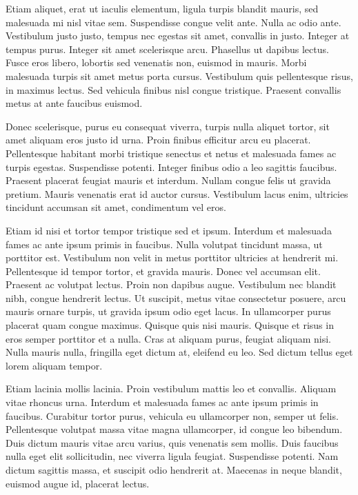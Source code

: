 Etiam aliquet, erat ut iaculis elementum, ligula turpis blandit mauris,
sed malesuada mi nisl vitae sem. Suspendisse congue velit ante. Nulla
ac odio ante. Vestibulum justo justo, tempus nec egestas sit amet,
convallis in justo. Integer at tempus purus. Integer sit amet scelerisque
arcu. Phasellus ut dapibus lectus. Fusce eros libero, lobortis sed
venenatis non, euismod in mauris. Morbi malesuada turpis sit amet
metus porta cursus. Vestibulum quis pellentesque risus, in maximus
lectus. Sed vehicula finibus nisl congue tristique. Praesent convallis
metus at ante faucibus euismod.

Donec scelerisque, purus eu consequat viverra, turpis nulla aliquet
tortor, sit amet aliquam eros justo id urna. Proin finibus efficitur
arcu eu placerat. Pellentesque habitant morbi tristique senectus et
netus et malesuada fames ac turpis egestas. Suspendisse potenti. Integer
finibus odio a leo sagittis faucibus. Praesent placerat feugiat mauris
et interdum. Nullam congue felis ut gravida pretium. Mauris venenatis
erat id auctor cursus. Vestibulum lacus enim, ultricies tincidunt
accumsan sit amet, condimentum vel eros.

Etiam id nisi et tortor tempor tristique sed et ipsum. Interdum et
malesuada fames ac ante ipsum primis in faucibus. Nulla volutpat tincidunt
massa, ut porttitor est. Vestibulum non velit in metus porttitor ultricies
at hendrerit mi. Pellentesque id tempor tortor, et gravida mauris.
Donec vel accumsan elit. Praesent ac volutpat lectus. Proin non dapibus
augue. Vestibulum nec blandit nibh, congue hendrerit lectus. Ut suscipit,
metus vitae consectetur posuere, arcu mauris ornare turpis, ut gravida
ipsum odio eget lacus. In ullamcorper purus placerat quam congue maximus.
Quisque quis nisi mauris. Quisque et risus in eros semper porttitor
et a nulla. Cras at aliquam purus, feugiat aliquam nisi. Nulla mauris
nulla, fringilla eget dictum at, eleifend eu leo. Sed dictum tellus
eget lorem aliquam tempor.

Etiam lacinia mollis lacinia. Proin vestibulum mattis leo et convallis.
Aliquam vitae rhoncus urna. Interdum et malesuada fames ac ante ipsum
primis in faucibus. Curabitur tortor purus, vehicula eu ullamcorper
non, semper ut felis. Pellentesque volutpat massa vitae magna ullamcorper,
id congue leo bibendum. Duis dictum mauris vitae arcu varius, quis
venenatis sem mollis. Duis faucibus nulla eget elit sollicitudin,
nec viverra ligula feugiat. Suspendisse potenti. Nam dictum sagittis
massa, et suscipit odio hendrerit at. Maecenas in neque blandit, euismod
augue id, placerat lectus.

